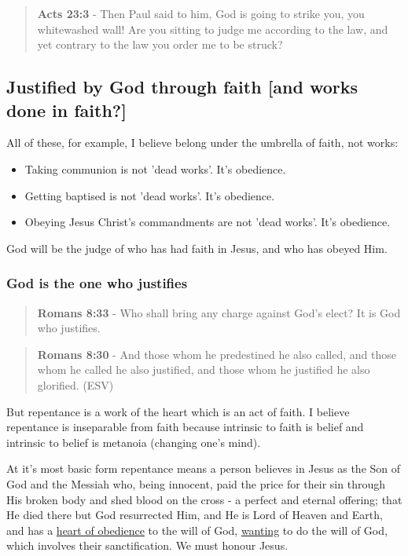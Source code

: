 \documentclass[11pt]{article}
\begin{document}
\begin{quote}
\textbf{Acts 23:3} - Then Paul said to him, God is going to strike you, you whitewashed wall! Are you sitting to judge me according to the law, and yet contrary to the law you order me to be struck?
\end{quote}

\subsection{Justified by God through faith [and works done in faith?]}
\label{sec:orgc257a8e}
All of these, for example,  I believe belong under the umbrella of faith, not works:
\begin{itemize}
\item Taking communion is not 'dead works'. It's obedience.
\item Getting baptised is not 'dead works'. It's obedience.
\item Obeying Jesus Christ's commandments are not 'dead works'. It's obedience.
\end{itemize}

God will be the judge of who has had faith in Jesus, and who has obeyed Him.

\subsubsection{God is the one who justifies}
\label{sec:org95370c1}

\begin{quote}
\textbf{Romans 8:33} - Who shall bring any charge against God's elect? It is God who justifies.
\end{quote}

\begin{quote}
\textbf{Romans 8:30} - And those whom he predestined he also called, and those whom he called he also justified, and those whom he justified he also glorified. (ESV)
\end{quote}

But repentance is a work of the heart which is an act of faith.
I believe repentance is inseparable from faith because intrinsic to faith is belief and intrinsic to belief is metanoia (changing one's mind).

At it's most basic form repentance means a
person believes in Jesus as the Son of God and the Messiah who, being innocent, paid the
price for their sin through His broken body
and shed blood on the cross - a perfect and
eternal offering; that He died there but God
resurrected Him, and He is Lord of Heaven and
Earth, and has a \uline{heart of obedience} to the will of God,
\uline{wanting} to do the will of God, which involves their sanctification.
We must honour Jesus.
\end{document}
